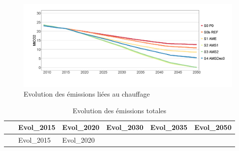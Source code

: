 \documentclass[]{article}
\begin{document}
\begin{figure}
\centering
\includegraphics{Exemple_sortiestertiaire_files/figure-latex/Evol_Em_Chauff-1.png}
\caption{Evolution des émissions liées au chauffage}
\end{figure}

\begin{longtable}[]{@{}clllll@{}}
\caption{Evolution des émissions totales}\tabularnewline
\toprule
\begin{minipage}[b]{0.18\columnwidth}\centering\strut
~\strut
\end{minipage} & \begin{minipage}[b]{0.13\columnwidth}\raggedright\strut
Evol\_2015\strut
\end{minipage} & \begin{minipage}[b]{0.13\columnwidth}\raggedright\strut
Evol\_2020\strut
\end{minipage} & \begin{minipage}[b]{0.13\columnwidth}\raggedright\strut
Evol\_2030\strut
\end{minipage} & \begin{minipage}[b]{0.13\columnwidth}\raggedright\strut
Evol\_2035\strut
\end{minipage} & \begin{minipage}[b]{0.13\columnwidth}\raggedright\strut
Evol\_2050\strut
\end{minipage}\tabularnewline
\midrule
\endfirsthead
\toprule
\begin{minipage}[b]{0.18\columnwidth}\centering\strut
~\strut
\end{minipage} & \begin{minipage}[b]{0.13\columnwidth}\raggedright\strut
Evol\_2015\strut
\end{minipage} & \begin{minipage}[b]{0.13\columnwidth}\raggedright\strut
Evol\_2020\strut
\end{minipage} & \begin{minipage}[b]{0.13\columnwidth}\raggedright\strut

\end{minipage}
\end{longtable}
\end{document}
